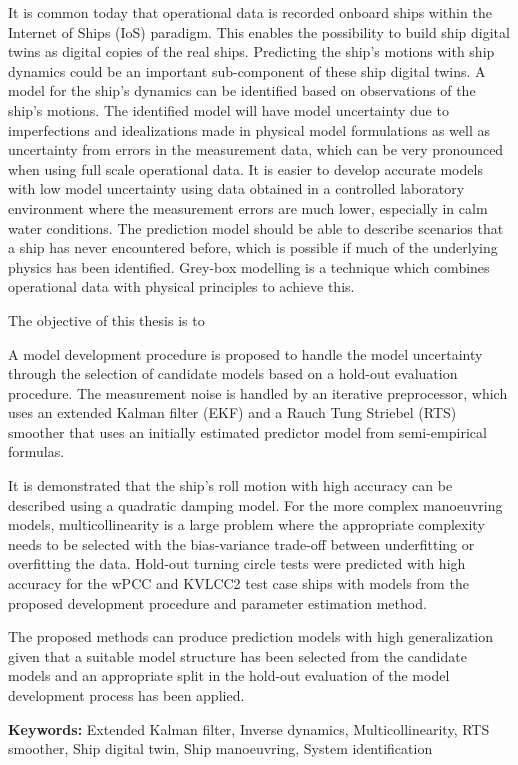 
It is common today that operational data is recorded onboard ships within the Internet of Ships (IoS) paradigm. This enables the possibility to build ship digital twins as digital copies of the real ships. Predicting the ship's motions with ship dynamics could be an important sub-component of these ship digital twins. A model for the ship's dynamics can be identified based on observations of the ship's motions. 
The identified model will have model uncertainty due to imperfections and idealizations made in physical model formulations as well as uncertainty from errors in the measurement data, which can be very pronounced when using full scale operational data. It is easier to develop accurate models with low model uncertainty using data obtained in a controlled laboratory environment where the measurement errors are much lower, especially in calm water conditions. The prediction model should be able to describe scenarios that a ship has never encountered before, which is possible if much of the underlying physics has been identified. Grey-box modelling is a technique which combines operational data with physical principles to achieve this. 
 
The objective of this thesis is to 
\noindent \objective 

A model development procedure is proposed to handle the model uncertainty through the selection of candidate models based on a hold-out evaluation procedure. The measurement noise is handled by an iterative preprocessor, which uses an extended Kalman filter (EKF) and a Rauch Tung Striebel (RTS) smoother that uses an initially estimated predictor model from semi-empirical formulas.

It is demonstrated that the ship's roll motion with high accuracy can be described using a quadratic damping model. For the more complex manoeuvring models, multicollinearity is a large problem where the appropriate complexity needs to be selected with the bias-variance trade-off between underfitting or overfitting the data. 
Hold-out turning circle tests were predicted with high accuracy for the wPCC and KVLCC2 test case ships with models from the proposed development procedure and parameter estimation method.

The proposed methods can produce prediction models with high generalization given that a suitable model structure has been selected from the candidate models and an appropriate split in the hold-out evaluation of the model development process has been applied. 

\vspace{0.3cm}
\noindent\textbf{Keywords:} Extended Kalman filter, Inverse dynamics, Multicollinearity, RTS smoother, Ship digital twin, Ship manoeuvring, System identification
\cleardoublepage

